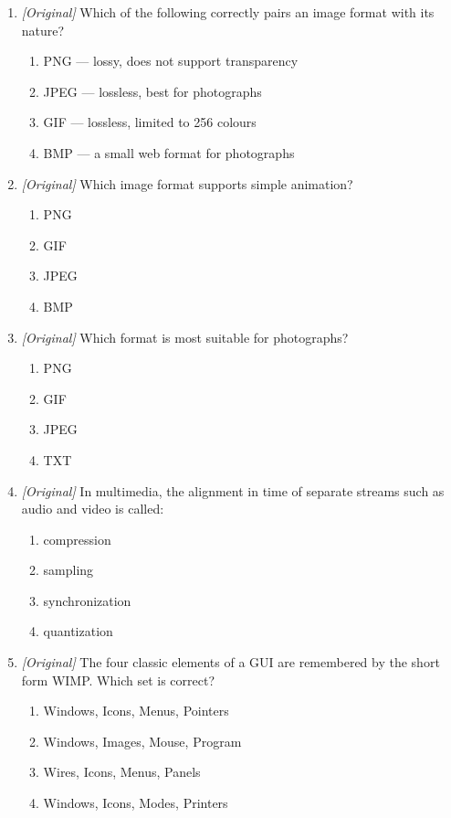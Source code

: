\documentclass[11pt]{article}
\begin{document}
\begin{enumerate}[label=\textbf{Q\arabic*.}, leftmargin=*]
\item \textit{[Original]} Which of the following correctly pairs an image
  format with its nature?
  \begin{enumerate}[label=\Alph*.]
    \item PNG --- lossy, does not support transparency
    \item JPEG --- lossless, best for photographs
    \item GIF --- lossless, limited to 256 colours
    \item BMP --- a small web format for photographs
  \end{enumerate}
\item \textit{[Original]} Which image format supports simple animation?
  \begin{enumerate}[label=\Alph*.]
    \item PNG
    \item GIF
    \item JPEG
    \item BMP
  \end{enumerate}
\item \textit{[Original]} Which format is most suitable for photographs?
  \begin{enumerate}[label=\Alph*.]
    \item PNG
    \item GIF
    \item JPEG
    \item TXT
  \end{enumerate}
\item \textit{[Original]} In multimedia, the alignment in time of separate
  streams such as audio and video is called:
  \begin{enumerate}[label=\Alph*.]
    \item compression
    \item sampling
    \item synchronization
    \item quantization
  \end{enumerate}
\item \textit{[Original]} The four classic elements of a GUI are remembered by
  the short form WIMP. Which set is correct?
  \begin{enumerate}[label=\Alph*.]
    \item Windows, Icons, Menus, Pointers
    \item Windows, Images, Mouse, Program
    \item Wires, Icons, Menus, Panels
    \item Windows, Icons, Modes, Printers

\end{enumerate}
\end{enumerate}
\end{document}
